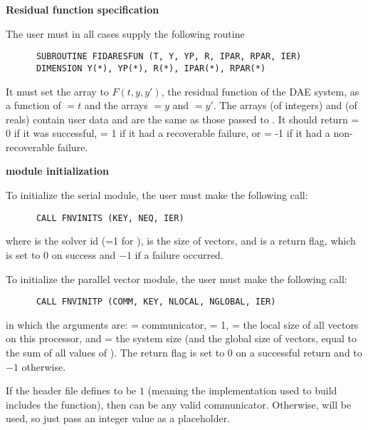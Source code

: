\begin{Steps}
  
\item {\bf Residual function specification}
  
  The user must in all cases supply the following {\F} routine
\begin{verbatim}
      SUBROUTINE FIDARESFUN (T, Y, YP, R, IPAR, RPAR, IER)
      DIMENSION Y(*), YP(*), R(*), IPAR(*), RPAR(*)
\end{verbatim}
  It must set the  array to $F(t,y,y')$, the residual function of the DAE
  system, as a function of  $ = t$ and the arrays  $ = y$ and
   $ = y'$.  
  The arrays  (of integers) and  (of reals) contain user data
  and are the same as those passed to .
  It should return  = 0 if it was successful,
   = 1 if it had a recoverable failure, or
   = -1 if it had a non-recoverable failure.
  
\item  {\bf {\nvector} module initialization}

  {\s} To initialize the serial {\nvector} module, the user must make the
  following call:
\begin{verbatim}
      CALL FNVINITS (KEY, NEQ, IER)
\end{verbatim}
  where 
   is the solver id (=1 for {\ida}),
   is the size of vectors, and
   is a return flag, which is set to $0$ on success and $-1$ 
  if a failure occurred.
  
  {\p} To initialize the parallel vector module, the user must make the
  following call:
\begin{verbatim}
      CALL FNVINITP (COMM, KEY, NLOCAL, NGLOBAL, IER)
\end{verbatim}
  in which the arguments are:  = {\mpi} communicator,  = 1,
   = the local size of all vectors on this processor, and
   = the system size (and the global size of vectors, equal to the
  sum of all values of ). The return flag  is
  set to $0$ on a successful return and to $-1$ otherwise.

  {\warn}If the header file  defines
   to be $1$ (meaning the {\mpi}
  implementation used to build {\sundials} includes the
   function), then  can be any valid
  {\mpi} communicator. Otherwise,  will be used, so
  just pass an integer value as a placeholder.


\end{Steps}
